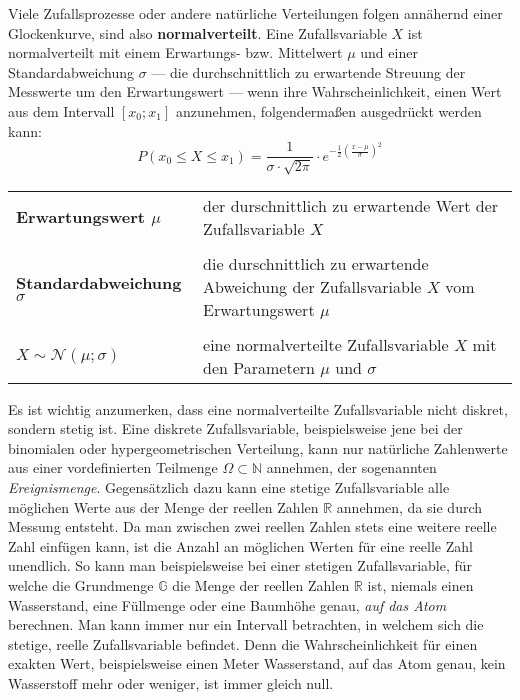 



\thispagestyle{plain}


Viele Zufallsprozesse oder andere nat\"{u}rliche Verteilungen folgen ann\"{a}hernd einer Glockenkurve, sind also \textbf{normalverteilt}. Eine Zufallsvariable $X$ ist normalverteilt mit einem Erwartungs- bzw. Mittelwert $\mu$ und einer Standardabweichung $\sigma$ --- die durchschnittlich zu erwartende Streuung der Messwerte um den Erwartungswert --- wenn ihre Wahrscheinlichkeit, einen Wert aus dem Intervall $[x_{0} ; x_{1}]$ anzunehmen, folgenderma\ss{}en ausgedr\"{u}ckt werden kann: $$P(x_{0} \leq X \leq x_{1}) = \frac{1}{\sigma \cdot \sqrt{2\pi}} \cdot e^{-\frac{1}{2}\left(\frac{x - \mu}{\sigma}\right)^2}$$

\begin{tabular}{l p{11cm}}
	\textbf{Erwartungswert $\mu$} &  der durschnittlich zu erwartende Wert der Zufallsvariable $X$
	\\ & \\
	\textbf{Standardabweichung $\sigma$} &  die durschnittlich zu erwartende Abweichung der Zufallsvariable $X$ vom Erwartungswert $\mu$
	\\ & \\
	\textbf{$X \sim \mathcal{N}(\mu; \sigma)$} &  eine normalverteilte Zufallsvariable $X$ mit den Parametern $\mu$ und $\sigma$
\end{tabular}

Es ist wichtig anzumerken, dass eine normalverteilte Zufallsvariable nicht diskret, sondern stetig ist. Eine diskrete Zufallsvariable, beispielsweise jene bei der binomialen oder hypergeometrischen Verteilung, kann nur nat\"{u}rliche Zahlenwerte aus einer vordefinierten Teilmenge $\Omega \subset \mathbb{N}$ annehmen, der sogenannten \emph{Ereignismenge}. Gegens\"{a}tzlich dazu kann eine stetige Zufallsvariable alle m\"{o}glichen Werte aus der Menge der reellen Zahlen $\mathbb{R}$ annehmen, da sie durch Messung entsteht. Da man zwischen zwei reellen Zahlen stets eine weitere reelle Zahl einf\"{u}gen kann, ist die Anzahl an m\"{o}glichen Werten f\"{u}r eine reelle Zahl unendlich. So kann man beispielsweise bei einer stetigen Zufallsvariable, f\"{u}r welche die Grundmenge $\mathbb{G}$ die Menge der reellen Zahlen $\mathbb{R}$ ist, niemals einen Wasserstand, eine F\"{u}llmenge oder eine Baumh\"{o}he genau, \emph{auf das Atom} berechnen. Man kann immer nur ein Intervall betrachten, in welchem sich die stetige, reelle Zufallsvariable befindet. Denn die Wahrscheinlichkeit f\"{u}r einen exakten Wert, beispielsweise einen Meter Wasserstand, auf das Atom genau, kein Wasserstoff mehr oder weniger, ist immer gleich null. 

